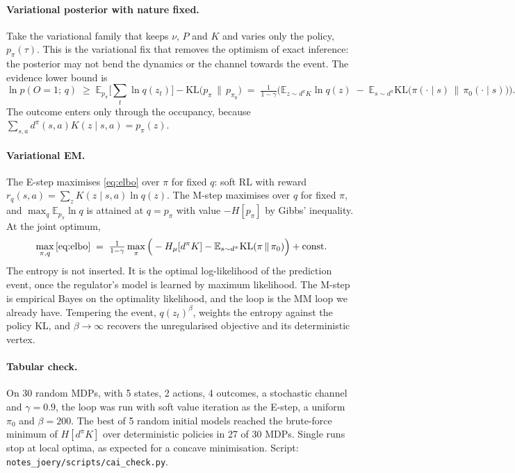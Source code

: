 \documentclass[10pt]{article}
\newcommand{\Hmu}{H_\mu}
\newcommand{\dpi}{d^\pi}
\newcommand{\E}{\mathbb E}
\begin{document}
\paragraph{Variational posterior with nature fixed.} Take the variational family that keeps $\nu$, $P$ and $K$ and varies only the policy, $p_\pi(\tau)$. This is the variational fix that removes the optimism of exact inference: the posterior may not bend the dynamics or the channel towards the event. The evidence lower bound is
\begin{equation}
  \ln p(O=1;\, q) \;\ge\; \E_{p_\pi}\Big[\sum_t \ln q(z_t)\Big] - \mathrm{KL}\big(p_\pi \,\|\, p_{\pi_0}\big)
  \;=\; \tfrac{1}{1-\gamma}\Big( \E_{z\sim \dpi K} \ln q(z) \;-\; \E_{s \sim \dpi} \mathrm{KL}\big(\pi(\cdot\mid s)\,\|\,\pi_0(\cdot\mid s)\big) \Big).
  \label{eq:elbo}
\end{equation}
The outcome enters only through the occupancy, because $\sum_{s,a} \dpi(s,a) K(z\mid s,a) = p_\pi(z)$.

\paragraph{Variational EM.} The E-step maximises \eqref{eq:elbo} over $\pi$ for fixed $q$: soft RL with reward $r_q(s,a) = \sum_z K(z\mid s,a) \ln q(z)$. The M-step maximises over $q$ for fixed $\pi$, and $\max_q \E_{p_\pi} \ln q$ is attained at $q = p_\pi$ with value $-H[p_\pi]$ by Gibbs' inequality. At the joint optimum,
\begin{equation}
  \max_{\pi, q} \text{\eqref{eq:elbo}} \;=\; \tfrac{1}{1-\gamma}\max_\pi \Big( -\Hmu[\dpi K] - \E_{s\sim\dpi} \mathrm{KL}(\pi\,\|\,\pi_0) \Big) + \text{const}.
\end{equation}
The entropy is not inserted. It is the optimal log-likelihood of the prediction event, once the regulator's model is learned by maximum likelihood. The M-step is empirical Bayes on the optimality likelihood, and the loop is the MM loop we already have. Tempering the event, $q(z_t)^{\beta}$, weights the entropy against the policy KL, and $\beta\to\infty$ recovers the unregularised objective and its deterministic vertex.

\paragraph{Tabular check.} On 30 random MDPs, with 5 states, 2 actions, 4 outcomes, a stochastic channel and $\gamma = 0.9$, the loop was run with soft value iteration as the E-step, a uniform $\pi_0$ and $\beta = 200$. The best of 5 random initial models reached the brute-force minimum of $H[\dpi K]$ over deterministic policies in 27 of 30 MDPs. Single runs stop at local optima, as expected for a concave minimisation. Script: \texttt{notes\_joery/scripts/cai\_check.py}.
\end{document}
